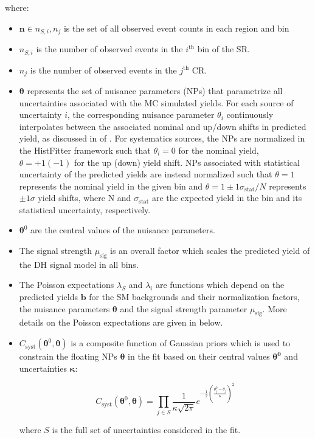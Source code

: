 where:

\begin{itemize}
    \item \(\boldsymbol{n}\in{n_{S,i}, n_j}\) is the set of all observed event counts in each region and bin
    \item \(n_{S,i}\) is the number of observed events in the \(i^\text{th}\) bin of the SR.
    \item \(n_j\) is the number of observed events in the \(j^\text{th}\) CR.
    \item \(\boldsymbol{\theta}\) represents the set of nuisance parameters (NPs) that parametrize all uncertainties associated with the MC simulated yields. For each source of uncertainty \(i\), the corresponding nuisance parameter \(\theta_i\) continuously interpolates between the associated nominal and up/down shifts in predicted yield, as discussed in  of . For systematics sources, the NPs are normalized in the HistFitter framework such that \(\theta_i=0\) for the nominal yield, \(\theta=+1(-1)\) for the up (down) yield shift. NPs associated with statistical uncertainty of the predicted yields are instead normalized such that \(\theta=1\) represents the nominal yield in the given bin and \(\theta=1\pm1\sigma_\text{stat}/N\) represents \(\pm1\sigma\) yield shifts, where N and \(\sigma_\text{stat}\) are the expected yield in the bin and its statistical uncertainty, respectively.
    \item \(\boldsymbol{\theta}^0\) are the central values of the nuisance parameters.
    \item The signal strength \(\mu_\text{sig}\) is an overall factor which scales the predicted yield of the DH signal model in all bins.
    \item The Poisson expectations \(\lambda_S\) and \(\lambda_i\) are functions which depend on the predicted yields \(\boldsymbol{b}\) for the SM backgrounds and their normalization factors, the nuisance parameters \(\boldsymbol{\theta}\) and the signal strength parameter \(\mu_\text{sig}\). More details on the Poisson expectations are given in \Sect{~\ref{ap:poisson_evtcounts}} below.
    
    \item \(C_\text{syst}(\boldsymbol{\theta}^0, \boldsymbol{\theta})\) is a composite function of Gaussian priors which is used to constrain the floating NPs \(\boldsymbol{\theta}\) in the fit based on their central values \(\boldsymbol{\theta^0}\) and uncertainties \(\boldsymbol{\kappa}\):

    \begin{equation}
    \label{eq:gaussian_np}
    C_\text{syst}(\boldsymbol{\theta}^0, \boldsymbol{\theta})= \prod_{j\in S} \frac{1}{\kappa\sqrt{2\pi}}e^{-\frac{1}{2}(\frac{\theta^0_j-\theta_j}{\kappa})^2}
    \end{equation}

    \noindent where \(S\) is the full set of uncertainties considered in the fit.
\end{itemize}



